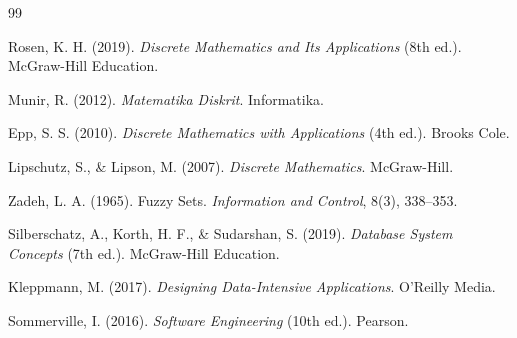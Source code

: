 \documentclass[11pt,a4paper]{article}
\begin{document}
\begin{thebibliography}{99}

	Rosen, K. H. (2019).
	\textit{Discrete Mathematics and Its Applications} (8th ed.).
	McGraw-Hill Education.

	Munir, R. (2012).
	\textit{Matematika Diskrit}.
	Informatika.

	Epp, S. S. (2010).
	\textit{Discrete Mathematics with Applications} (4th ed.).
	Brooks Cole.

	Lipschutz, S., \& Lipson, M. (2007).
	\textit{Discrete Mathematics}.
	McGraw-Hill.

	Zadeh, L. A. (1965).
	Fuzzy Sets.
	\textit{Information and Control}, 8(3), 338--353.

	Silberschatz, A., Korth, H. F., \& Sudarshan, S. (2019).
	\textit{Database System Concepts} (7th ed.).
	McGraw-Hill Education.

	Kleppmann, M. (2017).
	\textit{Designing Data-Intensive Applications}.
	O'Reilly Media.

	Sommerville, I. (2016).
	\textit{Software Engineering} (10th ed.).
	Pearson.

\end{thebibliography}
\end{document}
